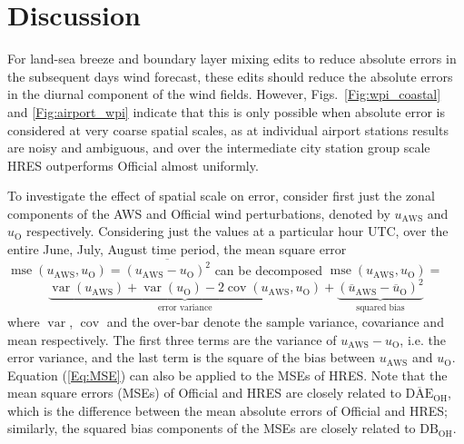 \documentclass[twocol]{ametsoc}
\DeclareMathOperator{\mse}{mse}
\DeclareMathOperator{\cov}{cov}
\DeclareMathOperator{\var}{var}
\begin{document}
\section{Discussion}
\label{Sec:Discussion}
For land-sea breeze and boundary layer mixing edits to reduce absolute errors in the subsequent days wind forecast, these edits should reduce the absolute errors in the diurnal component of the wind fields. However, Figs.~\ref{Fig:wpi_coastal} and \ref{Fig:airport_wpi} indicate that this is only possible when absolute error is considered at very coarse spatial scales, as at individual airport stations results are noisy and ambiguous, and over the intermediate city station group scale HRES outperforms Official almost uniformly.  

To investigate the effect of spatial scale on error, consider first just the zonal components of the AWS and Official wind perturbations, denoted by $u_\text{AWS}$ and $u_\text{O}$ respectively. Considering just the values at a particular hour UTC, over the entire June, July, August time period, the mean square error $\mse\left(u_\text{AWS}, u_\text{O}\right) = \overline{\left(u_\text{AWS} - u_\text{O}\right)^2}$ can be decomposed $\mse\left(u_\text{AWS}, u_\text{O}\right)=$ 
\begin{equation}
\underbrace{\var\left(u_\text{AWS}\right) + \var\left(u_\text{O}\right) - 2\cov\left(u_\text{AWS}, u_\text{O}\right)}_\text{error variance} + \underbrace{\left(\overline{u}_\text{AWS} - \overline{u}_\text{O}\right)^2}_{\text{squared bias}} \label{Eq:MSE}
\end{equation}
where $\var$, $\cov$ and the over-bar denote the sample variance, covariance and mean respectively. The first three terms are the variance of $u_\text{AWS} - u_\text{O}$, i.e. the error variance, and the last term is the square of the bias between $u_\text{AWS}$ and $u_\text{O}$. Equation (\ref{Eq:MSE}) can also be applied to the MSEs of HRES. Note that the mean square errors (MSEs) of Official and HRES are closely related to $\overline{\text{DAE}}_\text{OH}$, which is the difference between the mean absolute errors of Official and HRES; similarly, the squared bias components of the MSEs are closely related to $\text{DB}_\text{OH}$. 
\end{document}
